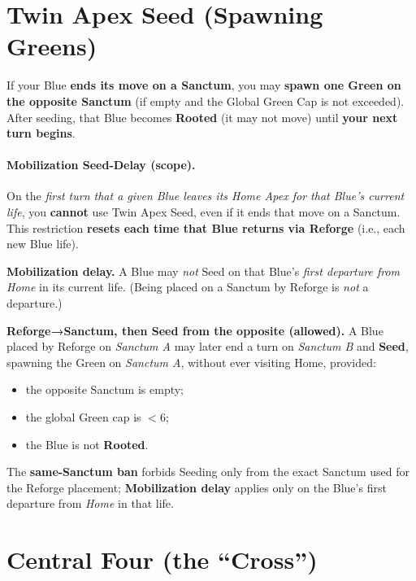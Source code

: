 \documentclass[11pt]{article}
\begin{document}
\section{Twin Apex Seed (Spawning Greens)}
\label{sec:twinapex}
If your Blue \textbf{ends its move on a Sanctum}, you may \textbf{spawn one Green on the opposite Sanctum} (if empty and the Global Green Cap is not exceeded). After seeding, that Blue becomes \textbf{Rooted} (it may not move) until \textbf{your next turn begins}.\\[2pt]
\paragraph{Mobilization Seed-Delay (scope).}
On the \emph{first turn that a given Blue leaves its Home Apex for that Blue’s current life}, you \textbf{cannot} use Twin Apex Seed, even if it ends that move on a Sanctum. 
This restriction \textbf{resets each time that Blue returns via Reforge} (i.e., each new Blue life).

\begin{tcolorbox}[enhanced,breakable,title={Rules Note — Mobilization Delay \& Reforge→Sanctum Seeding},
  colback=white,colframe=royal,boxrule=0.8pt]
\small
\textbf{Mobilization delay.} A Blue may \emph{not} Seed on that Blue’s \emph{first departure from Home} in its current life.
(Being placed on a Sanctum by Reforge is \emph{not} a departure.)

\medskip
\textbf{Reforge→Sanctum, then Seed from the opposite (allowed).} A Blue placed by Reforge on \emph{Sanctum A}
may later end a turn on \emph{Sanctum B} and \textbf{Seed}, spawning the Green on \emph{Sanctum A}, without ever
visiting Home, provided:
\begin{itemize}[leftmargin=1.1em,itemsep=0.2em]
  \item the opposite Sanctum is empty;
  \item the global Green cap is $<6$;
  \item the Blue is not \textbf{Rooted}.
\end{itemize}
The \textbf{same-Sanctum ban} forbids Seeding only from the exact Sanctum used for the Reforge placement;
\textbf{Mobilization delay} applies only on the Blue’s first departure from \emph{Home} in that life.
\end{tcolorbox}


\section{Central Four (the “Cross”)}
\label{sec:bluecross}
\end{document}
